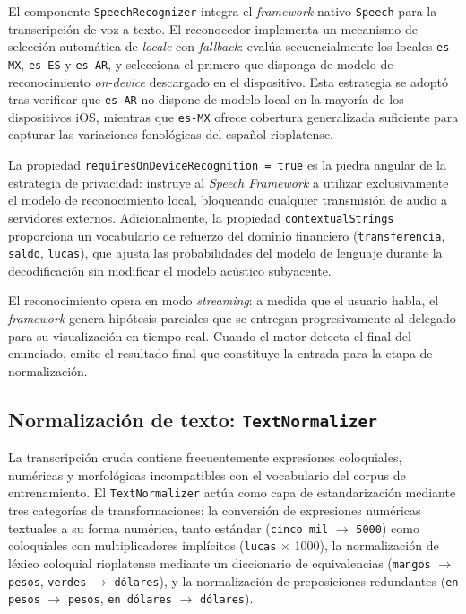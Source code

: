 El componente \texttt{Speech\allowbreak{}Recognizer} integra el \textit{framework} nativo \texttt{Speech} \citep{apple2026speech} para la transcripción de voz a texto. El reconocedor implementa un mecanismo de selección automática de \textit{locale} con \textit{fallback}: evalúa secuencialmente los locales \texttt{es-MX}, \texttt{es-ES} y \texttt{es-AR}, y selecciona el primero que disponga de modelo de reconocimiento \textit{on-device} descargado en el dispositivo. Esta estrategia se adoptó tras verificar que \texttt{es-AR} no dispone de modelo local en la mayoría de los dispositivos iOS, mientras que \texttt{es-MX} ofrece cobertura generalizada suficiente para capturar las variaciones fonológicas del español rioplatense.

La propiedad \texttt{requires\allowbreak{}On\allowbreak{}Device\allowbreak{}Recognition = true} es la piedra angular de la estrategia de privacidad: instruye al \textit{Speech Framework} a utilizar exclusivamente el modelo de reconocimiento local, bloqueando cualquier transmisión de audio a servidores externos. Adicionalmente, la propiedad \texttt{contextual\allowbreak{}Strings} proporciona un vocabulario de refuerzo del dominio financiero (\texttt{transferencia}, \texttt{saldo}, \texttt{lucas}), que ajusta las probabilidades del modelo de lenguaje durante la decodificación sin modificar el modelo acústico subyacente.

El reconocimiento opera en modo \textit{streaming}: a medida que el usuario habla, el \textit{framework} genera hipótesis parciales que se entregan progresivamente al delegado para su visualización en tiempo real. Cuando el motor detecta el final del enunciado, emite el resultado final que constituye la entrada para la etapa de normalización.

\subsection{Normalización de texto: \texttt{Text\allowbreak{}Normalizer}}

La transcripción cruda contiene frecuentemente expresiones coloquiales, numéricas y morfológicas incompatibles con el vocabulario del corpus de entrenamiento. El \texttt{Text\allowbreak{}Normalizer} actúa como capa de estandarización mediante tres categorías de transformaciones: la conversión de expresiones numéricas textuales a su forma numérica, tanto estándar (\texttt{cinco mil} $\rightarrow$ \texttt{5000}) como coloquiales con multiplicadores implícitos (\texttt{lucas} $\times$ 1000), la normalización de léxico coloquial rioplatense mediante un diccionario de equivalencias (\texttt{mangos} $\rightarrow$ \texttt{pesos}, \texttt{verdes} $\rightarrow$ \texttt{dólares}), y la normalización de preposiciones redundantes (\texttt{en pesos} $\rightarrow$ \texttt{pesos}, \texttt{en dólares} $\rightarrow$ \texttt{dólares}).


